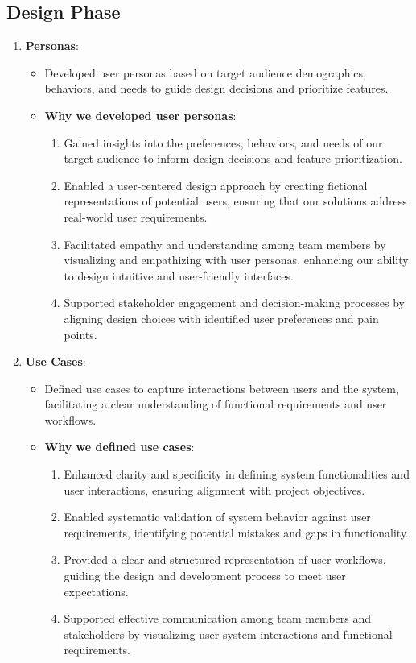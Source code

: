 \subsection{Design Phase}

\begin{enumerate}
    \item \textbf{Personas}:
    \begin{itemize}
        \item Developed user personas based on target audience demographics, behaviors, and needs to guide design decisions and prioritize features.
        \item \textbf{Why we developed user personas}:
            \begin{enumerate}
                \item Gained insights into the preferences, behaviors, and needs of our target audience to inform design decisions and feature prioritization.
                \item Enabled a user-centered design approach by creating fictional representations of potential users, ensuring that our solutions address real-world user requirements.
                \item Facilitated empathy and understanding among team members by visualizing and empathizing with user personas, enhancing our ability to design intuitive and user-friendly interfaces.
                \item Supported stakeholder engagement and decision-making processes by aligning design choices with identified user preferences and pain points.
            \end{enumerate}
    \end{itemize}

    
    \item \textbf{Use Cases}:
    \begin{itemize}
        \item Defined use cases to capture interactions between users and the system, facilitating a clear understanding of functional requirements and user workflows.
        \item \textbf{Why we defined use cases}:
            \begin{enumerate}
                \item Enhanced clarity and specificity in defining system functionalities and user interactions, ensuring alignment with project objectives.
                \item Enabled systematic validation of system behavior against user requirements, identifying potential mistakes and gaps in functionality.
                \item Provided a clear and structured representation of user workflows, guiding the design and development process to meet user expectations.
                \item Supported effective communication among team members and stakeholders by visualizing user-system interactions and functional requirements.
            \end{enumerate}
    \end{itemize}


\end{enumerate}
